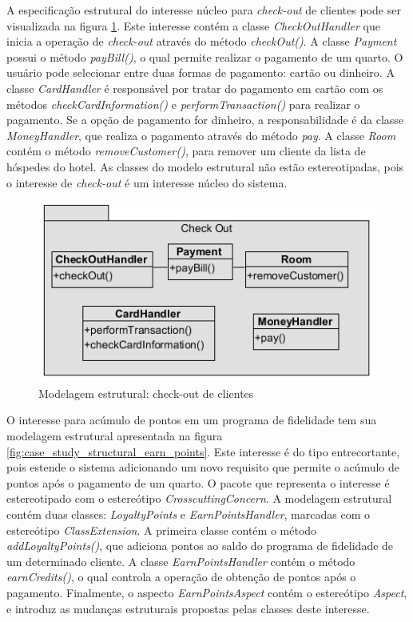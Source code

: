 A especificação estrutural do interesse núcleo para \textit{check-out} de clientes pode ser visualizada na figura
\ref{fig:case_study_structural_check_out}. Este interesse contém a classe \textit{CheckOutHandler} que inicia a operação de \textit{check-out} através 
do método \textit{checkOut()}. A classe \textit{Payment} possui o método \textit{payBill()}, o qual permite realizar o pagamento de um quarto. O
usuário pode selecionar entre duas formas de pagamento: cartão ou dinheiro. A classe \textit{CardHandler} é responsável por tratar do pagamento em
cartão com os métodos \textit{checkCardInformation()} e \textit{performTransaction()} para realizar o pagamento. Se a opção de pagamento for dinheiro,
a responsabilidade é da classe \textit{MoneyHandler}, que realiza o pagamento através do método \textit{pay}. A classe \textit{Room} contém o método
\textit{removeCustomer()}, para remover um cliente da lista de hóspedes do hotel. As classes do modelo estrutural não estão estereotipadas, pois o
interesse de \textit{check-out} é um interesse núcleo do sistema.

  \begin{figure}[!h]
	\centering
	\includegraphics{img/case_study_structural_check_out.png}
	\caption{Modelagem estrutural: check-out de clientes}\label{fig:case_study_structural_check_out}
  \end{figure}

O interesse para acúmulo de pontos em um programa de fidelidade tem sua modelagem estrutural apresentada na figura
\ref{fig:case_study_structural_earn_points}. Este interesse é do tipo entrecortante, pois estende o sistema adicionando um novo requisito que
permite o acúmulo de pontos após o pagamento de um quarto. O pacote que representa o interesse é estereotipado com o estereótipo
\textit{CrosscuttingConcern}. A modelagem estrutural contém duas classes: \textit{LoyaltyPoints} e \textit{EarnPointsHandler}, marcadas com o
estereótipo \textit{ClassExtension}. A primeira classe contém o método \textit{addLoyaltyPoints()}, que adiciona pontos ao saldo do programa de
fidelidade de um determinado cliente. A classe \textit{EarnPointsHandler} contém o método \textit{earnCredits()}, o qual controla a operação de
obtenção de pontos após o pagamento. Finalmente, o aspecto \textit{EarnPointsAspect} contém o estereótipo \textit{Aspect}, e introduz as mudanças
estruturais propostas pelas classes deste interesse.

